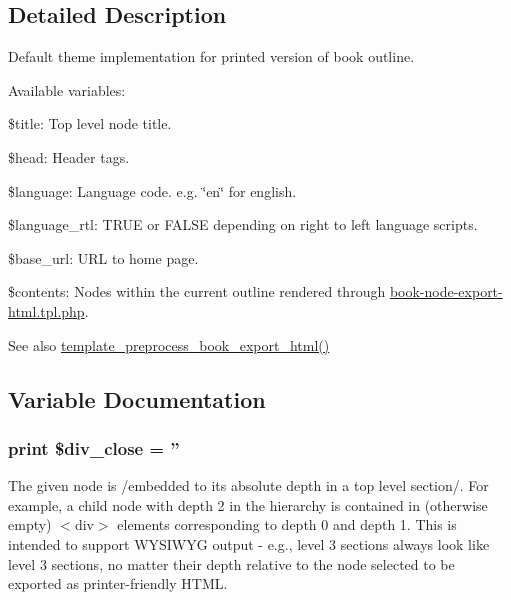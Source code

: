 \subsection{Detailed Description}
Default theme implementation for printed version of book outline.

Available variables:
\begin{DoxyItemize}
\item \$title: Top level node title.
\item \$head: Header tags.
\item \$language: Language code. e.g. \char`\"{}en\char`\"{} for english.
\item \$language\_\-rtl: TRUE or FALSE depending on right to left language scripts.
\item \$base\_\-url: URL to home page.
\item \$contents: Nodes within the current outline rendered through \hyperlink{book-node-export-html_8tpl_8php}{book-\/node-\/export-\/html.tpl.php}.
\end{DoxyItemize}

\begin{DoxySeeAlso}{See also}
\hyperlink{book_8module_ac66a30414a0cb26861b69beeab40a63d}{template\_\-preprocess\_\-book\_\-export\_\-html()} 
\end{DoxySeeAlso}


\subsection{Variable Documentation}
\hypertarget{book-export-html_8tpl_8php_ad7ca5cbbe327a2d37bf5ac15dc38efe0}{
\subsubsection[{\$div\_\-close}]{\setlength{\rightskip}{0pt plus 5cm}print \$div\_\-close = ''}}
\label{book-export-html_8tpl_8php_ad7ca5cbbe327a2d37bf5ac15dc38efe0}
The given node is /embedded to its absolute depth in a top level section/. For example, a child node with depth 2 in the hierarchy is contained in (otherwise empty) $<$div$>$ elements corresponding to depth 0 and depth 1. This is intended to support WYSIWYG output -\/ e.g., level 3 sections always look like level 3 sections, no matter their depth relative to the node selected to be exported as printer-\/friendly HTML. 
